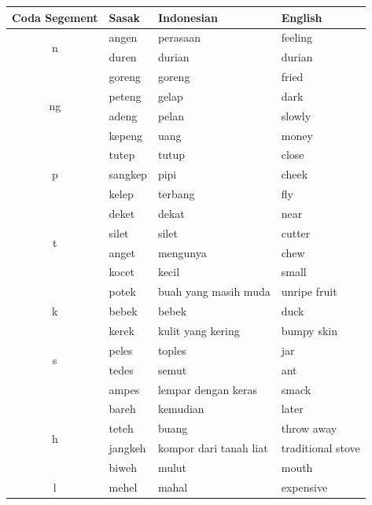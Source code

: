 \documentclass[12pt]{ouparticle}
\begin{document}
\begin{table}[]
    \centering
    \begin{tabular}{c|l l l}
    Coda Segement & Sasak & Indonesian & English  \\
    \hline                   
    \multirow{2}{*}{n} & angen  & perasaan & feeling\\
                       & duren & durian & durian\\
    \hline                   
    \multirow{4}{*}{ng} & goreng & goreng & fried\\
                       & peteng & gelap & dark\\
                       & adeng & pelan & slowly\\
                       & kepeng & uang   & money \\
    \hline                   
    \multirow{3}{*}{p} & tutep & tutup & close\\
                       & sangkep & pipi & cheek\\
                       & kelep & terbang & fly\\
    \hline                   
    \multirow{4}{*}{t} & deket & dekat & near\\
                       & silet & silet & cutter\\
                       & anget & mengunya & chew\\
                       & kocet & kecil   & small \\
     \hline
    \multirow{3}{*}{k} & potek & buah yang masih muda & unripe fruit\\
                       & bebek & bebek & duck\\
                       & kerek & kulit yang kering & bumpy skin\\
    \hline                   
    \multirow{2}{*}{s} & peles & toples & jar\\
                       & tedes & semut & ant\\
                       & ampes & lempar dengan keras & smack \\
    \hline
    \multirow{4}{*}{h} & bareh & kemudian & later\\
                       & teteh & buang & throw away\\
                       & jangkeh & kompor dari tanah liat & traditional stove\\
                       & biweh & mulut   & mouth \\
    \hline
    \multirow{2}{*}{l} & mehel & mahal & expensive\\

\end{tabular}
\end{table}
\end{document}
